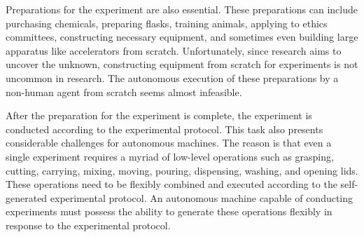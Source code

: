 Preparations for the experiment are also essential. These preparations can include purchasing chemicals, preparing flasks, training animals, applying to ethics committees, constructing necessary equipment, and sometimes even building large apparatus like accelerators from scratch. Unfortunately, since research aims to uncover the unknown, constructing equipment from scratch for experiments is not uncommon in research. The autonomous execution of these preparations by a non-human agent from scratch seems almost infeasible.

After the preparation for the experiment is complete, the experiment is conducted according to the experimental protocol. This task also presents considerable challenges for autonomous machines. The reason is that even a single experiment requires a myriad of low-level operations such as grasping, cutting, carrying, mixing, moving, pouring, dispensing, washing, and opening lids. These operations need to be flexibly combined and executed according to the self-generated experimental protocol. An autonomous machine capable of conducting experiments must possess the ability to generate these operations flexibly in response to the experimental protocol.







